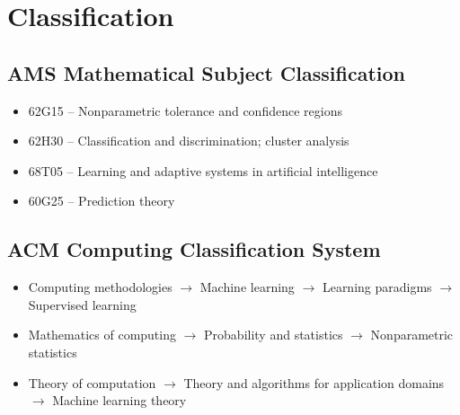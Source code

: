 \section*{Classification}

\subsection*{AMS Mathematical Subject Classification}

\begin{itemize}
    \item 62G15 -- Nonparametric tolerance and confidence regions
    \item 62H30 -- Classification and discrimination; cluster analysis
    \item 68T05 -- Learning and adaptive systems in artificial intelligence
    \item 60G25 -- Prediction theory
\end{itemize}

\subsection*{ACM Computing Classification System}

\begin{itemize}
    \item Computing methodologies $\rightarrow$ Machine learning $\rightarrow$ Learning paradigms $\rightarrow$ Supervised learning
    \item Mathematics of computing $\rightarrow$ Probability and statistics $\rightarrow$ Nonparametric statistics
    \item Theory of computation $\rightarrow$ Theory and algorithms for application domains $\rightarrow$ Machine learning theory
\end{itemize}